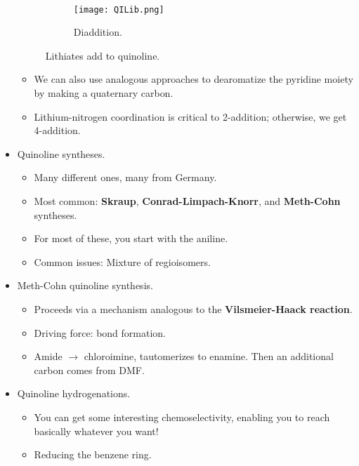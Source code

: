\documentclass[../notes.tex]{subfiles}
\begin{document}
\begin{itemize}
\begin{figure}[h!]
\begin{subfigure}[b]{\linewidth}
            \label{fig:QILia}
        \end{subfigure}\\[2em]
        \begin{subfigure}[b]{\linewidth}
            \centering
            \texttt{[image: QILib.png]}
            \caption{Diaddition.}
            \label{fig:QILib}
        \end{subfigure}
        \caption{Lithiates add to quinoline.}
        \label{fig:QILi}
    \end{figure}
    \begin{itemize}
        \item We can also use analogous approaches to dearomatize the pyridine moiety by making a quaternary carbon.
        \item Lithium-nitrogen coordination is critical to 2-addition; otherwise, we get 4-addition.
    \end{itemize}
    \item Quinoline syntheses.
    \begin{itemize}
        \item Many different ones, many from Germany.
        \item Most common: \textbf{Skraup}, \textbf{Conrad-Limpach-Knorr}, and \textbf{Meth-Cohn} syntheses.
        \item For most of these, you start with the aniline.
        \item Common issues: Mixture of regioisomers.
    \end{itemize}
    \item Meth-Cohn quinoline synthesis.
    \begin{itemize}
        \item Proceeds via a mechanism analogous to the \textbf{Vilsmeier-Haack reaction}.
        \item Driving force:  bond formation.
        \item Amide $\to$ chloroimine, tautomerizes to enamine. Then an additional carbon comes from DMF.
    \end{itemize}
    \item Quinoline hydrogenations.
    \begin{itemize}
        \item You can get some interesting chemoselectivity, enabling you to reach basically whatever you want!
        \item Reducing the benzene ring.
        \begin{itemize}

\end{itemize}
\end{itemize}
\end{itemize}
\end{document}
